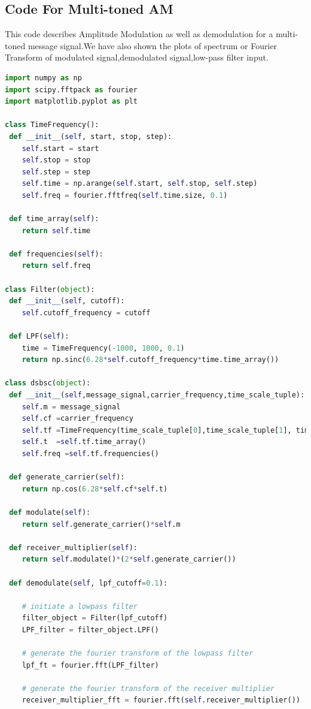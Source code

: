 \documentclass[12pt,a4paper]{article}%
\begin{document}
    \subsection{Code For Multi-toned AM}
    \begin{flushleft}This code  describes Amplitude Modulation as well as demodulation for a multi-toned message signal.We have also shown the plots of spectrum or Fourier Transform of modulated signal,demodulated signal,low-pass filter input.
    	\lstset{numbers=none,breaklines=true,} 
    	\begin{lstlisting}[language=python]
import numpy as np
import scipy.fftpack as fourier
import matplotlib.pyplot as plt

class TimeFrequency():
 def __init__(self, start, stop, step):
	self.start = start
	self.stop = stop
	self.step = step
	self.time = np.arange(self.start, self.stop, self.step)
	self.freq = fourier.fftfreq(self.time.size, 0.1)

 def time_array(self):
	return self.time

 def frequencies(self):
	return self.freq

class Filter(object):
 def __init__(self, cutoff):
	self.cutoff_frequency = cutoff

 def LPF(self):
	time = TimeFrequency(-1000, 1000, 0.1)
	return np.sinc(6.28*self.cutoff_frequency*time.time_array())

class dsbsc(object):
 def __init__(self,message_signal,carrier_frequency,time_scale_tuple):
	self.m = message_signal
	self.cf =carrier_frequency
	self.tf =TimeFrequency(time_scale_tuple[0],time_scale_tuple[1], time_scale_tuple[2])
	self.t  =self.tf.time_array()
	self.freq =self.tf.frequencies()

 def generate_carrier(self):
	return np.cos(6.28*self.cf*self.t)

 def modulate(self):
	return self.generate_carrier()*self.m

 def receiver_multiplier(self):
	return self.modulate()*(2*self.generate_carrier())

 def demodulate(self, lpf_cutoff=0.1):

	# initiate a lowpass filter
	filter_object = Filter(lpf_cutoff)
	LPF_filter = filter_object.LPF()
	
	# generate the fourier transform of the lowpass filter
	lpf_ft = fourier.fft(LPF_filter)
	
	# generate the fourier transform of the receiver multiplier
	receiver_multiplier_fft = fourier.fft(self.receiver_multiplier())
	

\end{lstlisting}
\end{flushleft}
\end{document}

